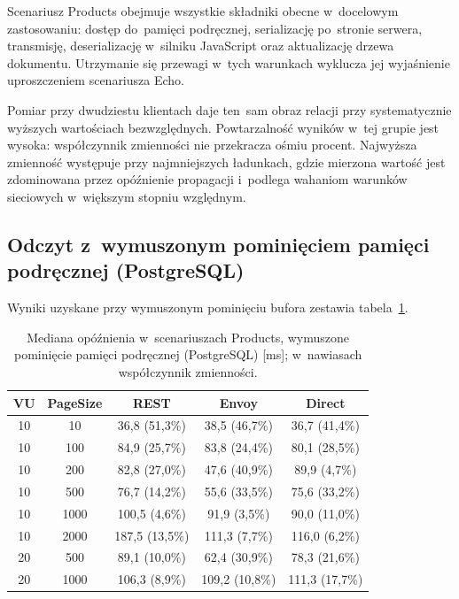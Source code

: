 Scenariusz Products obejmuje wszystkie składniki obecne w~docelowym zastosowaniu: dostęp do~pamięci podręcznej, serializację po~stronie serwera, transmisję, deserializację w~silniku JavaScript oraz aktualizację drzewa dokumentu. Utrzymanie się przewagi w~tych warunkach wyklucza jej wyjaśnienie uproszczeniem scenariusza Echo.

Pomiar przy dwudziestu klientach daje ten~sam obraz relacji przy systematycznie wyższych wartościach bezwzględnych. Powtarzalność wyników w~tej grupie jest wysoka: współczynnik zmienności nie przekracza ośmiu procent. Najwyższa zmienność występuje przy najmniejszych ładunkach, gdzie mierzona wartość jest zdominowana przez opóźnienie propagacji i~podlega wahaniom warunków sieciowych w~większym stopniu względnym.

\subsection{Odczyt z~wymuszonym pominięciem pamięci podręcznej (PostgreSQL)}
\label{subsec:ProductsCold}

Wyniki uzyskane przy wymuszonym pominięciu bufora zestawia tabela~\ref{tab:ProductsCold}.

\begin{table}[htb]
\centering
\footnotesize
\caption{Mediana opóźnienia w~scenariuszach Products, wymuszone pominięcie pamięci podręcznej (PostgreSQL) [ms]; w~nawiasach współczynnik zmienności.}
\label{tab:ProductsCold}
\begin{tabular}{|c|c|c|c|c|}
\hline
\textbf{VU} & \textbf{PageSize} & \textbf{REST} & \textbf{Envoy} & \textbf{Direct} \\
\hline
10 & 10   & 36,8 (51,3\%) & 38,5 (46,7\%) & 36,7 (41,4\%) \\
10 & 100  & 84,9 (25,7\%) & 83,8 (24,4\%) & 80,1 (28,5\%) \\
10 & 200  & 82,8 (27,0\%) & 47,6 (40,9\%) & 89,9 (4,7\%) \\
10 & 500  & 76,7 (14,2\%) & 55,6 (33,5\%) & 75,6 (33,2\%) \\
10 & 1000 & 100,5 (4,6\%) & 91,9 (3,5\%) & 90,0 (11,0\%) \\
10 & 2000 & 187,5 (13,5\%) & 111,3 (7,7\%) & 116,0 (6,2\%) \\
\hline
20 & 500  & 89,1 (10,0\%) & 62,4 (30,9\%) & 78,3 (21,6\%) \\
20 & 1000 & 106,3 (8,9\%) & 109,2 (10,8\%) & 111,3 (17,7\%) \\
\hline
\end{tabular}
\end{table}

